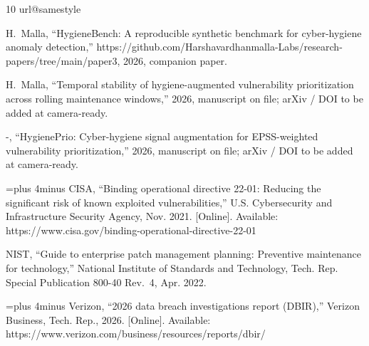 \documentclass[journal]{IEEEtran}
\begin{document}
\begin{thebibliography}{10}
\providecommand{\url}[1]{#1}
\csname url@samestyle\endcsname
\providecommand{\newblock}{\relax}
\providecommand{\bibinfo}[2]{#2}
\providecommand{\BIBentrySTDinterwordspacing}{\spaceskip=0pt\relax}
\providecommand{\BIBentryALTinterwordstretchfactor}{4}
\providecommand{\BIBentryALTinterwordspacing}{\spaceskip=\fontdimen2\font plus
\BIBentryALTinterwordstretchfactor\fontdimen3\font minus
  \fontdimen4\font\relax}
\providecommand{\BIBforeignlanguage}[2]{{%
\expandafter\ifx\csname l@#1\endcsname\relax
\typeout{** WARNING: IEEEtran.bst: No hyphenation pattern has been}%
\typeout{** loaded for the language `#1'. Using the pattern for}%
\typeout{** the default language instead.}%
\else
\language=\csname l@#1\endcsname
\fi
#2}}
\providecommand{\BIBdecl}{\relax}
\BIBdecl

H.~Malla, ``{HygieneBench}: A reproducible synthetic benchmark for
  cyber-hygiene anomaly detection,''
  \url{https://github.com/Harshavardhanmalla-Labs/research-papers/tree/main/paper3},
  2026, companion paper.

H.~Malla, ``Temporal stability of hygiene-augmented vulnerability
  prioritization across rolling maintenance windows,'' 2026, manuscript on
  file; arXiv / DOI to be added at camera-ready.

-, ``{HygienePrio}: Cyber-hygiene signal augmentation for {EPSS}-weighted
  vulnerability prioritization,'' 2026, manuscript on file; arXiv / DOI to be
  added at camera-ready.

\BIBentryALTinterwordspacing
{CISA}, ``Binding operational directive 22-01: Reducing the significant risk of
  known exploited vulnerabilities,'' U.S. Cybersecurity and Infrastructure
  Security Agency, Nov. 2021. [Online]. Available:
  \url{https://www.cisa.gov/binding-operational-directive-22-01}
\BIBentrySTDinterwordspacing

{NIST}, ``Guide to enterprise patch management planning: Preventive maintenance
  for technology,'' National Institute of Standards and Technology, Tech. Rep.
  Special Publication 800-40 Rev.~4, Apr. 2022.

\BIBentryALTinterwordspacing
{Verizon}, ``2026 data breach investigations report ({DBIR}),'' Verizon
  Business, Tech. Rep., 2026. [Online]. Available:
  \url{https://www.verizon.com/business/resources/reports/dbir/}
\BIBentrySTDinterwordspacing


\end{thebibliography}
\end{document}
